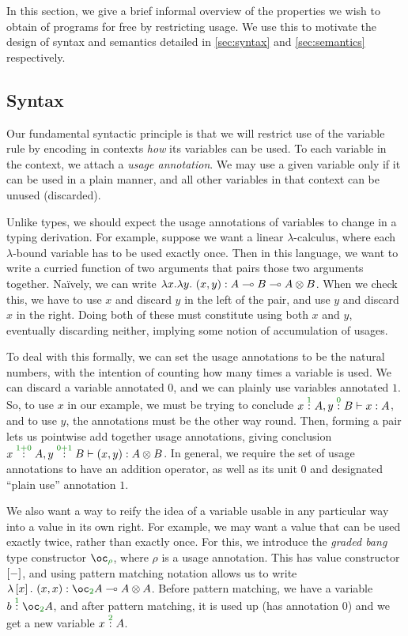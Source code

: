 In this section, we give a brief informal overview of the properties we wish to
obtain of programs for free by restricting usage.
We use this to motivate the design of syntax and semantics detailed in
\autoref{sec:syntax} and \autoref{sec:semantics} respectively.

\subsection{Syntax}

Our fundamental syntactic principle is that we will restrict use of the variable
rule by encoding in contexts \emph{how} its variables can be used.
To each variable in the context, we attach a \emph{usage annotation}.
We may use a given variable only if it can be used in a plain manner, and all
other variables in that context can be unused (discarded).

Unlike types, we should expect the usage annotations of variables to change in a
typing derivation.
For example, suppose we want a linear $\lambda$-calculus, where each
$\lambda$-bound variable has to be used exactly once.
Then in this language, we want to write a curried function of two arguments that
pairs those two arguments together.
Na\"ively, we can write
$\lambda x.\lambda y.~(x, y) : A \multimap B \multimap A \otimes B$.
When we check this, we have to use $x$ and discard $y$ in the left of the pair,
and use $y$ and discard $x$ in the right.
Doing both of these must constitute using both $x$ and $y$, eventually
discarding neither, implying some notion of accumulation of usages.

To deal with this formally, we can set the usage annotations to be the natural
numbers, with the intention of counting how many times a variable is used.
We can discard a variable annotated $0$, and we can plainly use variables
annotated $1$.
So, to use $x$ in our example, we must be trying to conclude
$\ctxvar{x}{A}{1}, \ctxvar{y}{B}{0} \vdash x : A$, and to use $y$, the
annotations must be the other way round.
Then, forming a pair lets us pointwise add together usage annotations, giving
conclusion
$\ctxvar{x}{A}{1+0}, \ctxvar{y}{B}{0+1} \vdash (x, y) : \tensor{A}{B}$.
In general, we require the set of usage annotations to have an addition
operator, as well as its unit $0$ and designated ``plain use'' annotation $1$.

We also want a way to reify the idea of a variable usable in any particular way
into a value in its own right.
For example, we may want a value that can be used exactly twice, rather than
exactly once.
For this, we introduce the \emph{graded bang} type constructor $\excl{\rho}$,
where $\rho$ is a usage annotation.
This has value constructor $\left[-\right]$, and using pattern matching notation
allows us to write $\lambda\bang{x}.~(x, x) : \fun{\excl{2}{A}}{\tensor{A}{A}}$.
Before pattern matching, we have a variable $\ctxvar{b}{\excl{2}{A}}{1}$, and
after pattern matching, it is used up (has annotation $0$) and we get a new
variable $\ctxvar{x}{A}{2}$.

